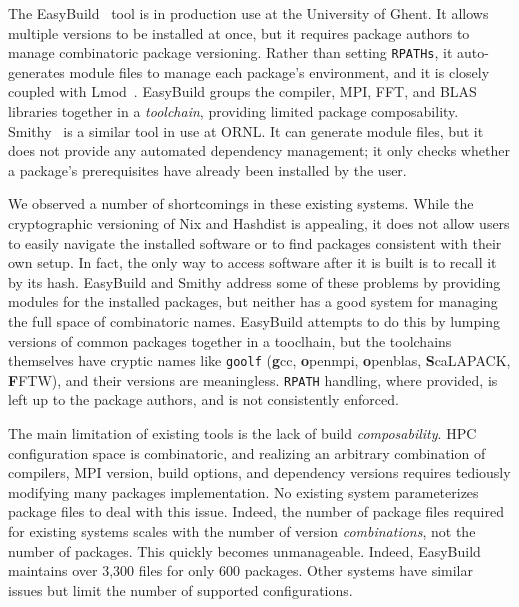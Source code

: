 The EasyBuild~\cite{hoste+:pyhpc12} tool is in production use at
the University of Ghent.  It allows multiple versions to be installed at once,
but it requires package authors to manage combinatoric package
versioning. Rather than setting {\tt RPATHs}, it auto-generates module files
to manage each package's environment, and it is closely coupled with 
Lmod~\cite{geimer+:hust14}.  EasyBuild groups
the compiler, MPI, FFT, and BLAS libraries together in a
{\it toolchain}, providing limited package composability. 
Smithy~\cite{digirolamo:smithy} is a similar tool in use at ORNL. It
can generate module files, but it does not provide any 
automated dependency management; it only checks whether a package's
prerequisites have already been installed by the user.

We observed a number of shortcomings in these existing systems. While the
cryptographic versioning of Nix and Hashdist is appealing, it does not allow
users to easily navigate the installed software or to find packages consistent
with their own setup.  In fact, the only way to access software after it is built
is to recall it by its hash. EasyBuild and Smithy address some of these problems
by providing modules for the installed packages, but neither has a good system
for managing the full space of combinatoric names.  EasyBuild attempts to do this by
lumping versions of common packages together in a tooclhain, but the toolchains
themselves have cryptic names like {\tt goolf} 
(\textbf{g}cc, \textbf{o}penmpi, \textbf{o}penblas, \textbf{S}caLAPACK,
\textbf{F}FTW), and their versions are meaningless. {\tt RPATH} handling, where
provided, is left up to the package authors, and is not consistently enforced.

The main limitation of existing tools is the lack of build {\it composability}.
HPC configuration space is combinatoric, and realizing an arbitrary
combination of compilers, MPI version, build options, and dependency versions
requires tediously modifying many packages implementation.  
No existing system parameterizes 
package files to deal with this issue.  Indeed, the number of package files
required for existing systems scales with the number of version {\it combinations},
not the number of packages.  This quickly becomes unmanageable.  Indeed, EasyBuild
maintains over 3,300 files for only 600 packages.  Other systems have similar
issues but limit the number of supported configurations.











